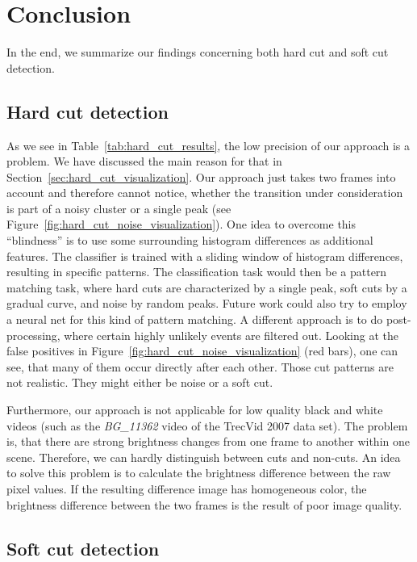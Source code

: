 \section{Conclusion}
\label{sec:conclusion}
In the end, we summarize our findings concerning both hard cut and soft cut detection.

\subsection{Hard cut detection}
\label{sec:conclusion_hard_cut}

As we see in Table~\ref{tab:hard_cut_results}, the low precision of our approach is a problem.
We have discussed the main reason for that in Section~\ref{sec:hard_cut_visualization}.
Our approach just takes two frames into account and therefore cannot notice, whether the transition under consideration is part of a noisy cluster or a single peak (see Figure~\ref{fig:hard_cut_noise_visualization}).
One idea to overcome this ``blindness'' is to use some surrounding histogram differences as additional features.
The classifier is trained with a sliding window of histogram differences, resulting in specific patterns.
The classification task would then be a pattern matching task, where hard cuts are characterized by a single peak, soft cuts by a gradual curve, and noise by random peaks.
Future work could also try to employ a neural net for this kind of pattern matching.
A different approach is to do post-processing, where certain highly unlikely events are filtered out.
Looking at the false positives in Figure~\ref{fig:hard_cut_noise_visualization} (red bars), one can see, that many of them occur directly after each other.
Those cut patterns are not realistic.
They might either be noise or a soft cut.

Furthermore, our approach is not applicable for low quality black and white videos (such as the \emph{BG\_11362} video of the TrecVid 2007 data set).
The problem is, that there are strong brightness changes from one frame to another within one scene.
Therefore, we can hardly distinguish between cuts and non-cuts.
An idea to solve this problem is to calculate the brightness difference between the raw pixel values.
If the resulting difference image has homogeneous color, the brightness difference between the two frames is the result of poor image quality.


\subsection{Soft cut detection}
\label{sec:conclusion_hard_cut}

